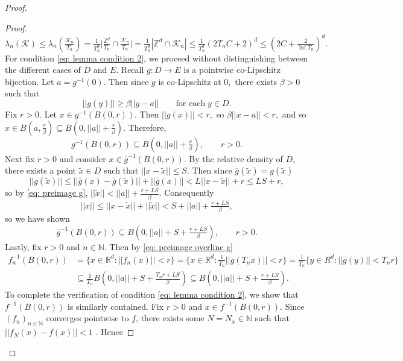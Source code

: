 \documentclass{article}
\newcommand{\R}{\mathbb{R}}
\newcommand{\Z}{\mathbb{Z}}
\newcommand{\N}{\mathbb{N}}
\begin{document}
\begin{proof}
\begin{proof}
$$\lambda_n(\mathcal{K}) \leq \lambda_n\left(\tfrac{\mathcal{K}_n}{T_n}\right)= \tfrac{1}{T_n^d}\bigg|\tfrac{\Z^d}{T_n} \cap \tfrac{\mathcal{K}_n}{T_n}\bigg| =\tfrac{1}{T_n^d}|\Z^d \cap \mathcal{K}_n|\leq \tfrac{1}{T_n^d}\left(2T_nC+2\right)^d \leq \left(2C+\tfrac{2}{\inf T_n}\right)^d .$$
For condition \eqref{eq: lemma condition 2}, we proceed without distinguishing between the different cases of $D$ and $E$. Recall $g: D\to E$ is a pointwise co-Lipschitz bijection. Let $a =g^{-1}(0)$. Then since $g$ is co-Lipschitz at $0,$ there exists $\beta>0$ such that $$||g(y)|| \geq \beta||y-a|| \qquad\text{for each}\; y \in D.$$ 
Fix $r > 0.$ Let $x \in g^{-1}(B(0,r)).$ Then $||g(x)|| < r,$ so $\beta||x-a|| <r,$ and so $x \in B(a, \frac{r}{\beta}) \subseteq B(0, ||a||+\frac{r}{\beta}).$ Therefore,
\begin{equation} \label{eq: preimage g}
    g^{-1}(B(0,r)) \subseteq B\left(0, ||a|| + \tfrac{r}{\beta}\right), \qquad r>0.
\end{equation}
Next fix $r>0$ and consider $x \in \overline{g}^{-1}(B(0,r)).$ By the relative density of $D,$ there exists a point $\widetilde{x} \in D$ such that $||x-\widetilde{x}|| \leq S.$ Then since $\overline{g}(\widetilde{x}) = g(\widetilde{x})$
$$||g(\widetilde{x})|| \leq ||\overline{g}(x) - \overline{g}(\widetilde{x})|| + ||\overline{g}(x)|| < L||x-\widetilde{x}|| + r \leq LS+r,$$
so by \eqref{eq: preimage g}, $||\widetilde{x}|| < ||a|| + \frac{r+LS}{\beta}.$ Consequently
$$||x|| \leq ||x-\widetilde{x}|| + ||\widetilde{x}|| < S + ||a|| + \tfrac{r+LS}{\beta},$$ so we have shown 
\begin{equation} \label{eq: preimage overline g}
    \overline{g}^{-1}(B(0,r)) \subseteq B\left(0, ||a|| + S + \tfrac{r+LS}{\beta}\right), \qquad r>0.
\end{equation}
Lastly, fix $r>0$ and $n \in \N.$ Then by \eqref{eq: preimage overline g}
\begin{equation} \label{eq: preimage fn}
    \begin{split}
        f_n^{-1}(B(0,r)) &= \{x \in \R^d: ||f_n(x)|| < r\} = \{x \in \R^d:\tfrac{1}{T_n}||\overline{g}(T_nx)|| <r\} = \tfrac{1}{T_n}\{y \in R^d:||\overline{g}(y)|| <T_nr\} \\
        &\subseteq \tfrac{1}{T_n}B\left(0,||a|| + S + \tfrac{T_nr+LS}{\beta}\right)\subseteq B\left(0, ||a|| +S+\tfrac{r+LS}{\beta}\right).
    \end{split}
\end{equation}
To complete the verification of condition \eqref{eq: lemma condition 2}, we show that $f^{-1}(B(0,r))$ is similarly contained. Fix $r>0$ and $x \in f^{-1}(B(0,r)).$ Since $(f_n)_{n \in \N}$ converges pointwise to $f$, there exists some $N=N_x \in \N$ such that $||f_N(x)-f(x)|| <1$ . Hence

\end{proof}
\end{proof}
\end{document}
